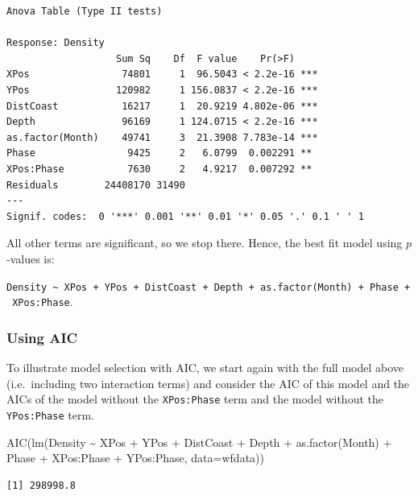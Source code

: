 \documentclass[
  oneside]{krantz}
\newenvironment{Shaded}{\begin{snugshade}}{\end{snugshade}}
\newcommand{\AttributeTok}[1]{\textcolor[rgb]{0.77,0.63,0.00}{#1}}
\newcommand{\FunctionTok}[1]{\textcolor[rgb]{0.00,0.00,0.00}{#1}}
\newcommand{\NormalTok}[1]{#1}
\newcommand{\SpecialCharTok}[1]{\textcolor[rgb]{0.00,0.00,0.00}{#1}}
\begin{document}
\begin{verbatim}
Anova Table (Type II tests)

Response: Density
                   Sum Sq    Df  F value    Pr(>F)    
XPos                74801     1  96.5043 < 2.2e-16 ***
YPos               120982     1 156.0837 < 2.2e-16 ***
DistCoast           16217     1  20.9219 4.802e-06 ***
Depth               96169     1 124.0715 < 2.2e-16 ***
as.factor(Month)    49741     3  21.3908 7.783e-14 ***
Phase                9425     2   6.0799  0.002291 ** 
XPos:Phase           7630     2   4.9217  0.007292 ** 
Residuals        24408170 31490                       
---
Signif. codes:  0 '***' 0.001 '**' 0.01 '*' 0.05 '.' 0.1 ' ' 1
\end{verbatim}

All other terms are significant, so we stop there. Hence, the best fit model using \(p\)-values is:

\texttt{Density\ \textasciitilde{}\ XPos\ +\ YPos\ +\ DistCoast\ +\ Depth\ +\ as.factor(Month)\ +\ Phase\ +\ XPos:Phase}.

\hypertarget{using-aic}{%
\subsubsection{Using AIC}\label{using-aic}}

To illustrate model selection with AIC, we start again with the full model above (i.e.~including two interaction terms) and consider the AIC of this model and the AICs of the model without the \texttt{XPos:Phase} term and the model without the \texttt{YPos:Phase} term.

\small

\begin{Shaded}
\begin{Highlighting}[]
\FunctionTok{AIC}\NormalTok{(}\FunctionTok{lm}\NormalTok{(Density }\SpecialCharTok{\textasciitilde{}}\NormalTok{ XPos }\SpecialCharTok{+}\NormalTok{ YPos }\SpecialCharTok{+}\NormalTok{ DistCoast }\SpecialCharTok{+}\NormalTok{ Depth }\SpecialCharTok{+} \FunctionTok{as.factor}\NormalTok{(Month) }\SpecialCharTok{+}  
\NormalTok{                     Phase }\SpecialCharTok{+}\NormalTok{ XPos}\SpecialCharTok{:}\NormalTok{Phase }\SpecialCharTok{+}\NormalTok{ YPos}\SpecialCharTok{:}\NormalTok{Phase, }\AttributeTok{data=}\NormalTok{wfdata))}
\end{Highlighting}
\end{Shaded}

\begin{verbatim}
[1] 298998.8
\end{verbatim}
\end{document}
